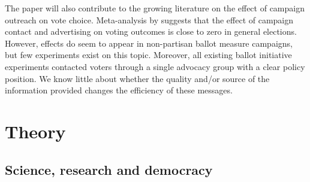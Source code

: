 \documentclass[12pt,final,fleqn]{article}
\theoremstyle{plain}
\begin{document}
The paper will also contribute to the growing literature on the effect of campaign outreach on vote choice. Meta-analysis by \citet{kalla2018minimal} suggests that the effect of campaign contact and advertising on voting outcomes is close to zero in general elections. However, effects do seem to appear in non-partisan ballot measure campaigns, but few experiments exist on this topic. Moreover, all existing ballot initiative experiments contacted voters through a single advocacy group with a clear policy position. We know little about whether the quality and/or source of the information provided changes the efficiency of these messages. 

 


\section{Theory} \label{sec:Theory}

\subsection{Science, research and democracy}  \label{sec: democracy}
\end{document}
